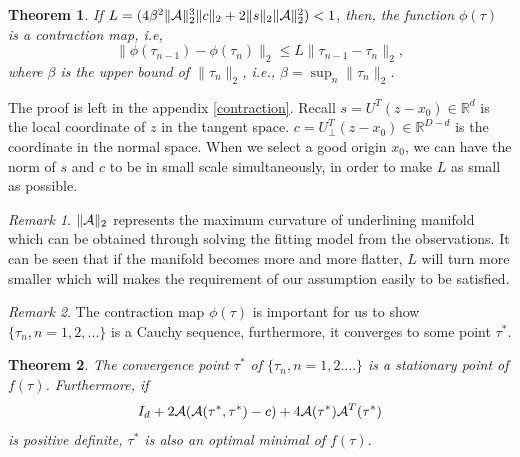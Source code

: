 \documentclass[aos,preprint]{imsart}
\newtheorem{theorem}{Theorem}[section]
\theoremstyle{remark}
\newtheorem*{remark}{Remark}
\begin{document}
\begin{theorem}
If $L = (4\beta^2\|{\cal A}\|_2^3\|c\|_2+2\|s\|_2\|{\cal A}\|_2^2)<1$,  then, the function $\phi(\tau)$ is a contraction map, i.e,
 \[
 \|\phi(\tau_{n-1})- \phi(\tau_{n})\|_2 \leq L\|\tau_{n-1} -\tau_n \|_2,
 \]
where $\beta$ is the upper bound of $\|\tau_n\|_2$, i.e., $\beta = \sup_n\|\tau_n\|_2$.
\end{theorem}
The proof is left in the appendix \ref{contraction}. Recall $s = U^T (z-x_0)\in {\mathbb R}^{d}$ is the local coordinate of $z$ in the tangent space.  $c = U^T_{\perp}(z-x_0)\in {\mathbb R}^{D-d}$ is the coordinate in the normal space. When we select a good origin $x_0$, we can have the norm of $s$ and $c$ to be in small scale simultaneously, in order to make $L$ as small as possible.
\begin{remark}
$\|{\cal A}\|_2$ represents the maximum curvature of underlining manifold which can be obtained through solving the fitting model from the observations. It can be seen that if the manifold becomes more and more flatter, $L$ will turn more smaller which will makes the requirement of our assumption easily to be satisfied.
\end{remark}
\begin{remark}
The contraction map  $\phi(\tau)$ is important for us to show $\{\tau_n, n=1,2,...\}$ is a Cauchy sequence, furthermore, it converges to some point $\tau^*$.
\end{remark}
\begin{theorem}
The convergence point $\tau^*$ of $\{\tau_n, n=1,2....\}$ is a stationary point of $f(\tau)$. Furthermore, if 
\[
I_d+2{\cal A}({\cal A}(\tau^*,\tau^*)-c) + 4{\cal A}(\tau^*){\cal A}^T(\tau^*)
\] 
is positive definite, $\tau^*$ is also an optimal minimal of $f(\tau)$.
\end{theorem}
\end{document}
